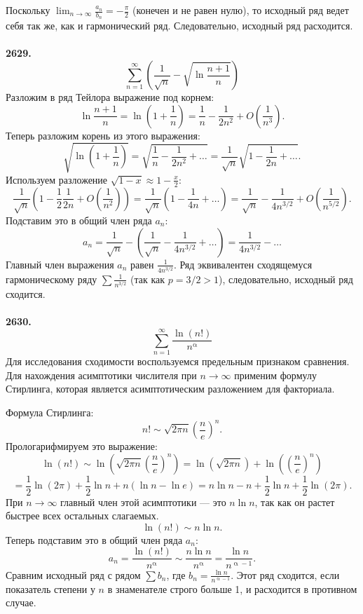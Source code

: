 \documentclass[a4paper, 12pt]{report}
\numberwithin{equation}{section}
\renewcommand{\alpha}{\upalpha}
\begin{document}
	Поскольку $\lim_{n \to \infty} \frac{a_n}{b_n} = -\frac{\pi}{2}$ (конечен и не равен нулю), то исходный ряд ведет себя так же, как и гармонический ряд.
	Следовательно, исходный ряд расходится.
	\\\\
	\textbf{2629.}
	$$\sum_{n=1}^{\infty} \left(\frac{1}{\sqrt{n}} - \sqrt{\ln\frac{n+1}{n}}\right)$$
	Разложим в ряд Тейлора выражение под корнем:
	$$ \ln\frac{n+1}{n} = \ln\left(1+\frac{1}{n}\right) = \frac{1}{n} - \frac{1}{2n^2} + O\left(\frac{1}{n^3}\right). $$
	Теперь разложим корень из этого выражения:
	$$ \sqrt{\ln\left(1+\frac{1}{n}\right)} = \sqrt{\frac{1}{n} - \frac{1}{2n^2} + \dots} = \frac{1}{\sqrt{n}}\sqrt{1-\frac{1}{2n}+\dots}. $$
	Используем разложение $\sqrt{1-x} \approx 1-\frac{x}{2}$:
	$$ \frac{1}{\sqrt{n}}\left(1-\frac{1}{2}\frac{1}{2n} + O\left(\frac{1}{n^2}\right)\right) = \frac{1}{\sqrt{n}}\left(1-\frac{1}{4n}+\dots\right) = \frac{1}{\sqrt{n}} - \frac{1}{4n^{3/2}} + O\left(\frac{1}{n^{5/2}}\right). $$
	Подставим это в общий член ряда $a_n$:
	$$ a_n = \frac{1}{\sqrt{n}} - \left(\frac{1}{\sqrt{n}} - \frac{1}{4n^{3/2}} + \dots\right) = \frac{1}{4n^{3/2}} - \dots $$
	Главный член выражения $a_n$ равен $\frac{1}{4n^{3/2}}$. Ряд эквивалентен сходящемуся гармоническому ряду $\sum \frac{1}{n^{3/2}}$ (так как $p=3/2 > 1$), следовательно, исходный ряд сходится.
	\\\\
	\textbf{2630.}
	$$\sum_{n=1}^{\infty} \frac{\ln(n!)}{n^\alpha}$$
	Для исследования сходимости воспользуемся предельным признаком сравнения. Для нахождения асимптотики числителя при $n \to \infty$ применим формулу Стирлинга, которая является асимптотическим разложением для факториала.
	
	Формула Стирлинга:
	$$ n! \sim \sqrt{2\pi n} \left(\frac{n}{e}\right)^n. $$
	Прологарифмируем это выражение:
	$$ \ln(n!) \sim \ln\left(\sqrt{2\pi n} \left(\frac{n}{e}\right)^n\right) = \ln(\sqrt{2\pi n}) + \ln\left(\left(\frac{n}{e}\right)^n\right) $$
	$$ = \frac{1}{2}\ln(2\pi) + \frac{1}{2}\ln n + n(\ln n - \ln e) = n\ln n - n + \frac{1}{2}\ln n + \frac{1}{2}\ln(2\pi). $$
	При $n \to \infty$ главный член этой асимптотики — это $n\ln n$, так как он растет быстрее всех остальных слагаемых.
	$$ \ln(n!) \sim n\ln n. $$
	Теперь подставим это в общий член ряда $a_n$:
	$$ a_n = \frac{\ln(n!)}{n^\alpha} \sim \frac{n\ln n}{n^\alpha} = \frac{\ln n}{n^{\alpha-1}}. $$
	Сравним исходный ряд с рядом $\sum b_n$, где $b_n = \frac{\ln n}{n^{\alpha-1}}$.
	Этот ряд сходится, если показатель степени у $n$ в знаменателе строго больше 1, и расходится в противном случае.
	
\end{document}
